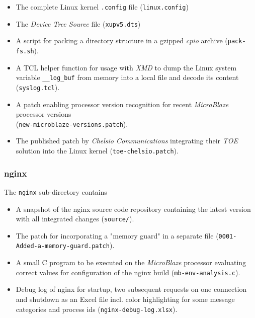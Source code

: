 \begin{itemize}
  \setlength{\itemsep}{1pt}
  \setlength{\parskip}{2pt}
  \setlength{\parsep}{2pt}
\item The complete Linux kernel \texttt{.config} file (\texttt{linux.config})
\item The \textit{Device Tree Source} file (\texttt{xupv5.dts})
\item A script for packing a directory structure in a gzipped \textit{cpio} archive (\texttt{pack-fs.sh}).
\item A TCL helper function for usage with \textit{XMD} to dump the Linux system variable \texttt{\_\_log\_buf} from memory into a local file and decode its content (\texttt{syslog.tcl}).
\item A patch enabling processor version recognition for recent \textit{MicroBlaze} processor versions\\ (\texttt{new-microblaze-versions.patch}).
\item The published patch by \textit{Chelsio Communications} integrating their \textit{TOE} solution into the Linux kernel (\texttt{toe-chelsio.patch}).
\end{itemize}

\subsubsection{nginx}
\label{appendix:memguard}

The \texttt{nginx} sub-directory contains 

\begin{itemize}
  \setlength{\itemsep}{1pt}
  \setlength{\parskip}{2pt}
  \setlength{\parsep}{2pt}
\item A snapshot of the nginx source code repository containing the latest version with all integrated changes (\texttt{source/}).
\item The patch for incorporating a "memory guard" in a separate file (\texttt{0001-Added-a-memory-guard.patch}).
\item A small C program to be executed on the \textit{MicroBlaze} processor evaluating correct values for configuration of the nginx build (\texttt{mb-env-analysis.c}).
\item Debug log of nginx for startup, two subsequent requests on one connection and shutdown as an Excel file incl. color highlighting for some message categories and process ids (\texttt{nginx-debug-log.xlsx}).
\end{itemize}

